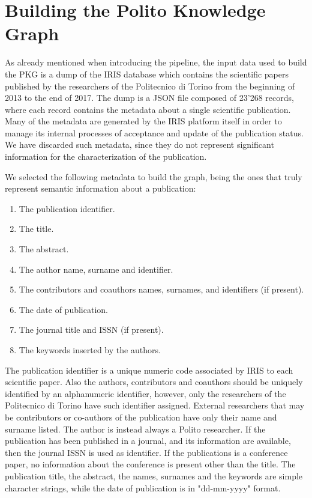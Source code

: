 \documentclass[%
    corpo=13.5pt,
    twoside,
    oldstyle,
    tipotesi=magistrale,
    greek,
    evenboxes
]{toptesi}
\begin{document}
\section{Building the Polito Knowledge Graph}
\label{sec:buildingpkg}

As already mentioned when introducing the pipeline, the input data used to
build the PKG is a dump of the IRIS database which contains the
scientific papers published by the researchers of the Politecnico di
Torino from the beginning of 2013 to the end of 2017.
The dump is a JSON file composed of 23'268 records, where each record contains
the metadata about a single scientific publication.
Many of the metadata are generated by the IRIS platform itself in
order to manage its internal processes of acceptance and update of the
publication status. We have discarded such metadata, since they do not
represent significant information for the characterization of the publication.

We selected the following metadata to build the graph, being the ones that
truly represent semantic information about a publication:

\begin{enumerate}
    \item The publication identifier.
    \item The title.
    \item The abstract.
    \item The author name, surname and identifier.
    \item The contributors and coauthors names, surnames, and identifiers
        (if present).
    \item The date of publication.
    \item The journal title and ISSN (if present).
    \item The keywords inserted by the authors.
\end{enumerate}

The publication identifier is a unique numeric code associated by IRIS to each
scientific paper. Also the authors, contributors and coauthors should be
uniquely identified by an alphanumeric identifier, however, only the researchers
of the Politecnico di Torino have such identifier assigned. External
researchers that may be contributors or co-authors of the publication have only
their name and surname listed. The author is instead always a Polito researcher.
If the publication has been published in a journal, and its information are
available, then the journal ISSN is used as identifier.
If the publications is a conference paper, no information about the conference
is present other than the title.
The publication title, the abstract, the names, surnames and the keywords are
simple character strings, while the date of publication is in "dd-mm-yyyy"
format.
\end{document}
